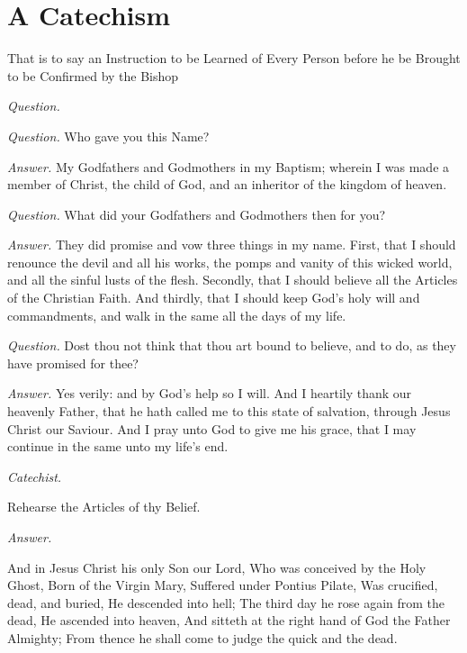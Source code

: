 
\newcommand{\qa}[1]{{\itshape\small\red#1}}

\chapter{A Catechism}

That is to say
an Instruction to be Learned of Every Person before he be Brought to be Confirmed by the Bishop

\centerline{\qa{Question.}}
\drop{What is your Name?\\
\qa{Answer.} \emph{N.} or \emph{M.}}

\qa{Question.} Who gave you this Name?

\qa{Answer.} My Godfathers and Godmothers in my Baptism; wherein I was made a member of Christ, the child of God, and an inheritor of the kingdom of heaven.

\qa{Question.} What did your Godfathers and Godmothers then for you?

\qa{Answer.} They did promise and vow three things in my name. First, that I should renounce the devil and all his works, the pomps and vanity of this wicked world, and all the sinful lusts of the flesh. Secondly, that I should believe all the Articles of the Christian Faith. And thirdly, that I should keep God's holy will and commandments, and walk in the same all the days of my life.

\qa{Question.} Dost thou not think that thou art bound to believe, and to do, as they have promised for thee?

\qa{Answer.} Yes verily: and by God's help so I will. And I heartily thank our heavenly Father, that he hath called me to this state of salvation, through Jesus Christ our Saviour. And I pray unto God to give me his grace, that I may continue in the same unto my life's end.


\medskip
\centerline{\qa{Catechist.}}
\centerline{Rehearse the Articles of thy Belief.}


\centerline{\qa{Answer.}}

And in Jesus Christ his only Son our Lord, Who was conceived by the Holy Ghost, Born of the Virgin Mary, Suffered under Pontius Pilate, Was crucified, dead, and buried, He descended into hell; The third day he rose again from the dead, He ascended into heaven, And sitteth at the right hand of God the Father Almighty; From thence he shall come to judge the quick and the dead.


